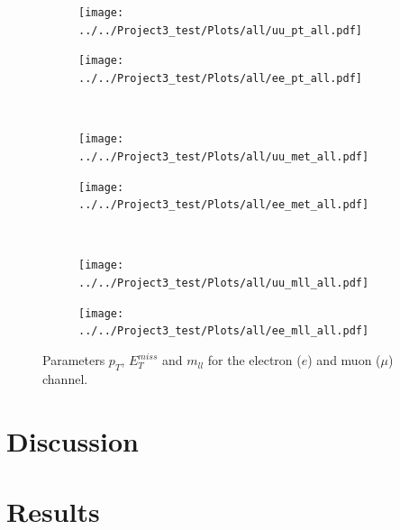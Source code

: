 \documentclass[12pt,a4paper]{amsart}
\begin{document}
\newpage
{}
\begin{figure}
    \centering
    \begin{subfigure}[b]{0.475\textwidth}
        \centering
        \texttt{[image: ../../Project3\_test/Plots/all/uu\_pt\_all.pdf]}
    \end{subfigure}
    \hfill
    \begin{subfigure}[b]{0.475\textwidth}  
        \centering 
        \texttt{[image: ../../Project3\_test/Plots/all/ee\_pt\_all.pdf]}
    \end{subfigure}
	~
    \begin{subfigure}[b]{0.475\textwidth}   
        \centering 
        \texttt{[image: ../../Project3\_test/Plots/all/uu\_met\_all.pdf]}
    \end{subfigure}
    \quad
    \begin{subfigure}[b]{0.475\textwidth}   
        \centering 
        \texttt{[image: ../../Project3\_test/Plots/all/ee\_met\_all.pdf]}
    \end{subfigure}
	~
    \begin{subfigure}[b]{0.475\textwidth}   
        \centering 
        \texttt{[image: ../../Project3\_test/Plots/all/uu\_mll\_all.pdf]}
    \end{subfigure}
    \quad
    \begin{subfigure}[b]{0.475\textwidth}
        \centering 
        \texttt{[image: ../../Project3\_test/Plots/all/ee\_mll\_all.pdf]}
    \end{subfigure}
    \caption[ Parameters transverse momentum), missing transverse energy, and invariant mass ]
    {\small Parameters $p_T$, $E_T^{miss}$ and $m_{ll}$ for the electron ($e$) and muon ($\mu$) channel. } 
    \label{fig:lepton_parameters}
\end{figure}
\restoregeometry 

\section{Discussion}
\section{Results}

\printbibliography
\end{document}
